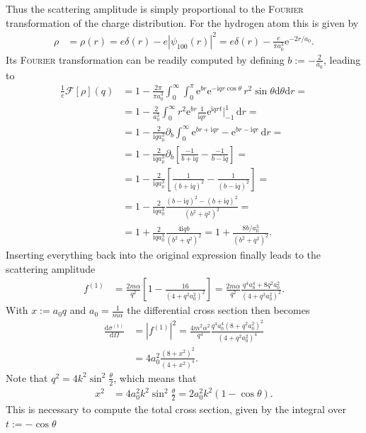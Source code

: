 \documentclass[english, parskip=full]{scrartcl}
\newcommand{\intx}{}
\newcommand{\klam}{}
\newcommand{\tecxt}{}
\def\I{\text{i}}
\def\e{\text{e}}
\begin{document}
Thus the scattering amplitude is simply proportional to the \textsc{Fourier} transformation of the charge distribution.
For the hydrogen atom this is given by
\begin{align}
\rho&=\rho(r)=e\delta (r)-e|\psi_{100}(r)|^2=e\delta (r)-\frac{e}{\pi a_0^3}\e^{-2r/a_0}.
\end{align}
Its \textsc{Fourier} transformation can be readily computed by defining $b:=-\frac{2}{a_0}$, leading to
\begin{align}
\frac{1}{e}\mathcal{F}[\rho](q)&=1-\frac{2\pi}{\pi a_0^3}\intx\int_{0}^{\infty}\intx\int_{0}^{\pi}\e^{br}\e^{-\I qr\cos\theta}\,r^2\sin\theta\mathrm{d}\theta\mathrm{d}r=\\
&=1-\frac{2}{a_0^3}\intx\int_{0}^{\infty}r^2\e^{br}\frac{1}{\I qr}\e^{\I qrt}\bigg\vert_{-1}^1\,\mathrm{d}r=\\
&=1-\frac{2}{\I qa_0^3}\partial_b\intx\int_{0}^{\infty}\e^{br+\I qr}-\e^{br-\I qr}\,\mathrm{d}r=\\
&=1-\frac{2}{\I qa_0^3}\partial_b\klam\left[ {\frac{-1}{b+\I q}-\frac{-1}{b-\I q}} \right]=\\
&=1-\frac{2}{\I qa_0^3}\klam\left[ {\frac{1}{(b+\I q)^2}-\frac{1}{(b-\I q)^2}} \right]=\\
&=1-\frac{2}{\I qa_0^3}\frac{(b-\I q)^2-(b+\I q)^2}{(b^2+q^2)^2}=\\
&=1+\frac{2}{\I qa_0^3}\frac{4\I qb}{(b^2+q^2)^2}=1+\frac{8b/a_0^3}{(b^2+q^2)^2}.
\end{align}
Inserting everything back into the original expression finally leads to the scattering amplitude
\begin{align}
f^{(1)}&=\frac{2m\alpha}{q^2}\klam\left[ {1-\frac{16}{(4+q^2a_0^2)^2}} \right]=\frac{2m\alpha}{q^2}\frac{q^4a_0^4+8q^2a_0^2}{(4+q^2a_0^2)^2}.
\end{align}
With $x:=a_0q$ and $a_0=\frac{1}{m\alpha}$ the differential cross section then becomes
\begin{align}
\frac{\tecxt\text{d}\sigma^{(1)}}{\tecxt\text{d}\Omega}&=\left\vert f^{(1)}\right\vert^2=\frac{4m^2\alpha^2}{q^4}\frac{q^4a_0^4(8+q^2a_0^2)^2}{(4+q^2a_0^2)^4}\\
&=4a_0^2\frac{(8+x^2)^2}{(4+x^2)^4}.
\end{align}
Note that $q^2=4k^2\sin^2\frac{\theta}{2}$, which means that 
\begin{align}
x^2&=4a_0^2k^2\sin^2\frac{\theta}{2}=2a_0^2k^2(1-\cos\theta).
\end{align}
This is necessary to compute the total cross section, given by the integral over $t:=-\cos\theta$
\end{document}
